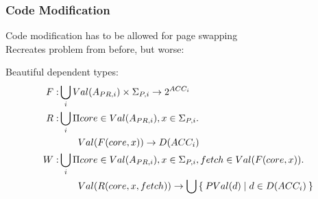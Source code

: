\documentclass{beamer}
\begin{document}
\begin{frame}[allowframebreaks]
\frametitle{Code Modification}
Code modification has to be allowed for page swapping
\\[20pt]
Recreates problem from before, but worse:
\begin{center}
\end{center}


\begin{center}
\end{center}

Beautiful dependent types:
\begin{align*}
F :& \bigcup_i  Val(A_{PR,i}) \times \Sigma_{P,i} \to 2^{ACC_i}
\\
R :& \bigcup_i \Pi core \in Val(A_{PR,i}), x \in \Sigma_{P,i} .
\\ & \qquad Val(F(core,x)) \to D(ACC_{i})
\\
W :& \bigcup_i \Pi core \in Val(A_{PR,i}), x \in \Sigma_{P,i}, fetch \in Val(F(core, x)). 
\\ & \qquad Val(R(core,x,fetch)) \to \bigcup \Set{ PVal(d) | d \in D(ACC_i) } 
\end{align*}
\end{frame}
\end{document}
